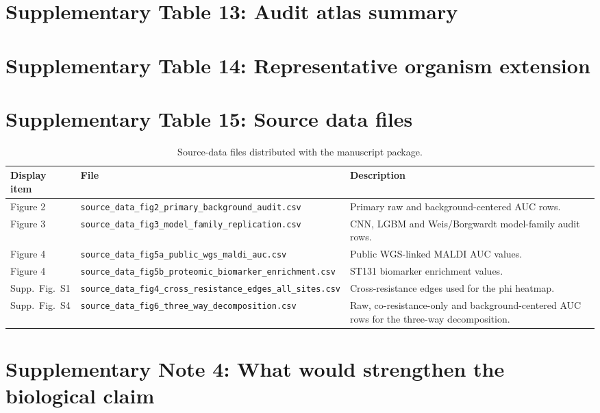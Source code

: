 \documentclass[11pt]{article}
\begin{document}


\section*{Supplementary Table 13: Audit atlas summary}



\section*{Supplementary Table 14: Representative organism extension}



\section*{Supplementary Table 15: Source data files}

\begin{table}[ht]
\centering
\small
\caption{Source-data files distributed with the manuscript package.}
\begin{tabular}{lll}
\toprule
Display item & File & Description \\
\midrule
Figure 2 & \texttt{source\_data\_fig2\_primary\_background\_audit.csv} & Primary raw and background-centered AUC rows. \\
Figure 3 & \texttt{source\_data\_fig3\_model\_family\_replication.csv} & CNN, LGBM and Weis/Borgwardt model-family audit rows. \\
Figure 4 & \texttt{source\_data\_fig5a\_public\_wgs\_maldi\_auc.csv} & Public WGS-linked MALDI AUC values. \\
Figure 4 & \texttt{source\_data\_fig5b\_proteomic\_biomarker\_enrichment.csv} & ST131 biomarker enrichment values. \\
Supp.\ Fig.\ S1 & \texttt{source\_data\_fig4\_cross\_resistance\_edges\_all\_sites.csv} & Cross-resistance edges used for the phi heatmap. \\
Supp.\ Fig.\ S4 & \texttt{source\_data\_fig6\_three\_way\_decomposition.csv} & Raw, co-resistance-only and background-centered AUC rows for the three-way decomposition. \\
\bottomrule
\end{tabular}
\end{table}

\section*{Supplementary Note 4: What would strengthen the biological claim}
\end{document}
